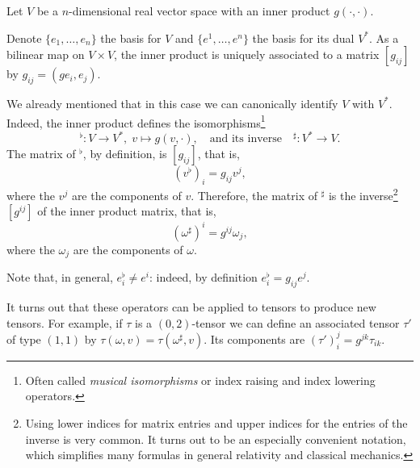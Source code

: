 \begin{example}
  Let $V$ be a $n$-dimensional real vector space with an inner product $g(\cdot, \cdot)$.

  Denote $\{e_1, \ldots, e_n\}$ the basis for $V$ and $\{e^1, \ldots, e^n\}$ the basis for its dual $V^*$.
  As a bilinear map on $V\times V$, the inner product is uniquely associated to a matrix $[g_{ij}]$ by $g_{ij} = (g e_i, e_j)$.

  We already mentioned that in this case we can canonically identify $V$ with $V^*$.
  Indeed, the inner product defines the isomorphisms\footnote{Often called \emph{musical isomorphisms} or index raising and index lowering operators.}
  \begin{equation}
    {}^\flat: V \to V^*,\; v\mapsto g(v, \cdot),
    \quad\mbox{and its inverse}\quad
    {}^\sharp: V^*\to V.
  \end{equation}
  The matrix of ${}^\flat$, by definition, is $[g_{ij}]$, that is,
  \begin{equation}
    (v^\flat)_i = g_{ij} v^j,
  \end{equation}
  where the $v^j$ are the components of $v$.
  Therefore, the matrix of ${}^\sharp$ is the inverse\footnote{Using lower indices for matrix entries and upper indices for the entries of the inverse is very common. It turns out to be an especially convenient notation, which simplifies many formulas in general relativity and classical mechanics.} $[g^{ij}]$ of the inner product matrix, that is, 
  \begin{equation}
    (\omega^\sharp)^i = g^{ij}\omega_j,
  \end{equation}
  where the $\omega_j$ are the components of $\omega$.

  Note that, in general, $e^\flat_i\neq e^i$: indeed, by definition $e^\flat_i = g_{ij}e^j$.

  It turns out that these operators can be applied to tensors to produce new tensors.
  For example, if $\tau$ is a $(0,2)$-tensor we can define an associated tensor $\tau'$ of type $(1,1)$ by $\tau(\omega, v) = \tau(\omega^\sharp, v)$.
  Its components are $(\tau')_i^j = g^{jk}\tau_{ik}$.
\end{example}

